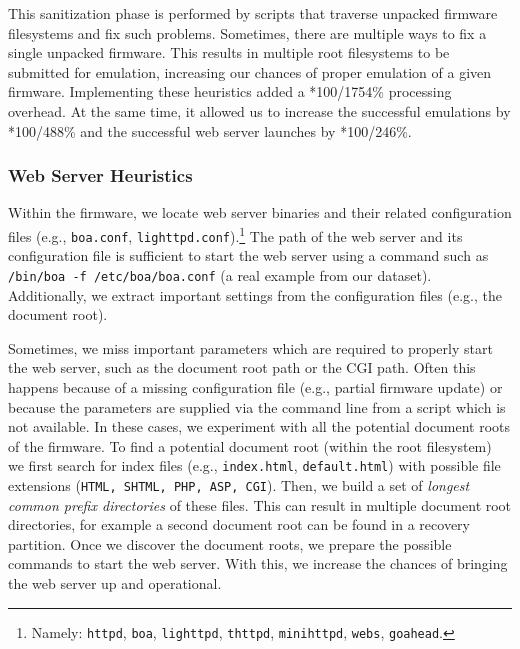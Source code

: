 \documentclass[conference]{./templates/ndss/IEEEtran}
\newcounter{t0d0_counter}
\newcounter{pr00f_counter}
\newcommand\printpercent[2]{\the\numexpr#1*100/#2\%}
\newcommand{\countrootfsforemulationBeforeFixingFS}{1754}
\newcommand{\countrootfsforemulationFixedFS}{228} \newcommand{\CountFirmwareEmulatedOK}{488}
\newcommand{\CountFirmwareEmulatedWebServerStarted}{246}
\newcommand{\CountFirmwareEmulatedOKByFixingFS}{9}
\newcommand{\CountFirmwareWebServerOKByFixingFS}{26}
\begin{document}
This sanitization phase is performed by scripts that traverse unpacked
firmware filesystems and fix such problems. Sometimes, there are
multiple ways to fix a single unpacked firmware. This results in
multiple root filesystems to be submitted for emulation, increasing our
chances of proper emulation of a given firmware. Implementing these 
heuristics added a 
\printpercent{\countrootfsforemulationFixedFS}{\countrootfsforemulationBeforeFixingFS} 
processing overhead. At the same time, it allowed us to increase the successful emulations by 
\printpercent{\CountFirmwareEmulatedOKByFixingFS}{\CountFirmwareEmulatedOK}
and the successful web server launches by 
\printpercent{\CountFirmwareWebServerOKByFixingFS}{\CountFirmwareEmulatedWebServerStarted}.


\subsubsection{Web Server Heuristics}
\label{sec:web-servers-docroots}

Within the firmware, we locate web server binaries and their
related configuration files (e.g., \texttt{boa.conf},
\texttt{lighttpd.conf}).\footnote{Namely:
\texttt{httpd}, \texttt{boa}, \texttt{lighttpd}, \texttt{thttpd},
\texttt{minihttpd}, \texttt{webs}, \texttt{goahead}.} 
The path of the web server and its
configuration file is sufficient to start the web server using a
command such as \texttt{/bin/boa -f /etc/boa/boa.conf} (a real example
from our dataset). Additionally, we extract important settings from
the configuration files (e.g., the document root).

Sometimes, we miss important parameters which are required 
to properly start the web server, such as the document root path or the CGI path.
Often this happens because of a missing configuration file 
(e.g., partial firmware update) or because the parameters are
supplied via the command line from a script which is not available. 
In these cases, we experiment with all the potential document roots of the firmware.
To find a potential document root (within the root filesystem) we first search for index files (e.g.,
\texttt{index.html}, \texttt{default.html}) with possible file
extensions (\texttt{HTML, SHTML, PHP, ASP, CGI}). 
Then, we build a set of \emph{longest common prefix 
directories} of these files. This can result in multiple document
root directories, for example a second document root can be found in 
a recovery partition.
Once we discover the document roots, we prepare the possible commands to start the web server. 
With this, we increase the chances of bringing the web server
up and operational.
\end{document}

